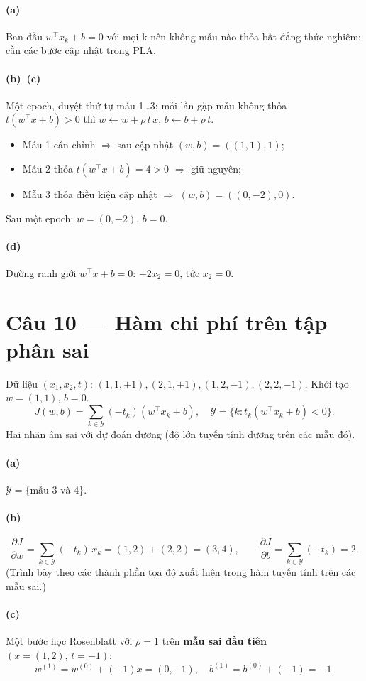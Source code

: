 \paragraph{(a)} Ban đầu $w^\top x_k+b=0$ với mọi k nên không mẫu nào thỏa bất đẳng thức nghiêm: cần các bước cập nhật trong PLA.

\paragraph{(b)--(c)} Một epoch, duyệt thứ tự mẫu 1\dots{}3; mỗi lần gặp mẫu không thỏa $t(w^\top x+b)>0$ thì
$w\leftarrow w+\rho\,t\,x$, $b\leftarrow b+\rho\,t$.
\begin{itemize}\itemsep0pt
    \item Mẫu 1 cần chỉnh $\Rightarrow$ sau cập nhật $(w,b)=((1,1),1)$;
    \item Mẫu 2 thỏa $t(w^\top x+b)=4>0$ $\Rightarrow$ giữ nguyên;
    \item Mẫu 3 thỏa điều kiện cập nhật $\Rightarrow$ $(w,b)=((0,-2),0)$.
\end{itemize}
Sau một epoch: $w=(0,-2)$, $b=0$.

\paragraph{(d)} Đường ranh giới $w^\top x+b=0$: $-2x_2=0$, tức $x_2=0$.

\section*{Câu 10 --- Hàm chi phí trên tập phân sai}
Dữ liệu $(x_1,x_2,t)$:
$(1,1,+1),(2,1,+1),(1,2,-1),(2,2,-1)$.
Khởi tạo $w=(1,1)$, $b=0$.
\[
J(w,b)=\sum_{k\in\mathcal Y}(-t_k)(w^\top x_k+b),\quad \mathcal Y=\{k: t_k(w^\top x_k+b)<0\}.
\]
Hai nhãn âm sai với dự đoán dương (độ lớn tuyến tính dương trên các mẫu đó).

\paragraph{(a)} $\mathcal Y=\{\text{mẫu 3 và 4}\}$.

\paragraph{(b)}
\[
\frac{\partial J}{\partial w}=\sum_{k\in\mathcal Y} (-t_k)\,x_k=(1{,}2)+(2{,}2)=(3{,}4),\qquad
\frac{\partial J}{\partial b}=\sum_{k\in\mathcal Y}(-t_k)=2.
\]
(Trình bày theo các thành phần tọa độ xuất hiện trong hàm tuyến tính trên các mẫu sai.)

\paragraph{(c)} Một bước học Rosenblatt với $\rho=1$ trên \textbf{mẫu sai đầu tiên} $(x{=}(1,2),\,t{=}{-}1)$:
\[
w^{(1)}=w^{(0)}+(-1)x=(0,-1),\quad b^{(1)}=b^{(0)}+(-1)=-1.
\]
